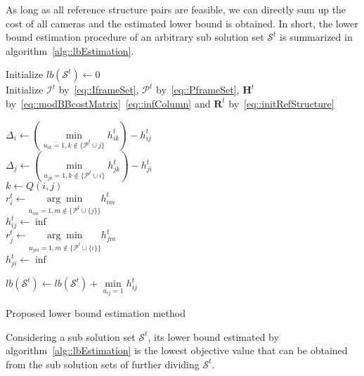 As long as all reference structure pairs are feasible, we can directly sum up the cost of all cameras and the estimated lower bound is obtained.
%
In short, the lower bound estimation procedure of an arbitrary sub solution set $\mathcal{S}^t$ is summarized in algorithm~\ref{alg::lbEstimation}.
%
\IncMargin{1em}
\begin{algorithm}[]
 \SetAlgoLined
 \BlankLine
 Initialize $lb(\mathcal{S}^t) \gets 0$\\
 Initialize $\mathcal{I}^t$ by~\eqref{eq::IframeSet}, $\mathcal{P}^t$ by~\eqref{eq::PframeSet}, $\mathbf{H}^t$ by~\eqref{eq::modBBcostMatrix}~\eqref{eq::infColumn} and $\mathbf{R}^t$ by~\eqref{eq::initRefStructure} \\
 {
 	$\Delta_i \gets \left( \underset{u_{ik}=1, k \notin \{\mathcal{P}^t \cup j\}}{\min} h_{ik}^t \right) - h_{ij}^t$ \\
	$\Delta_j \gets \left( \underset{u_{jk}=1, k \notin \{\mathcal{P}^t \cup i\}}{\min} h_{jk}^t \right) - h_{ji}^t$ \\
 	$k \gets Q(i,j)$ \\
 	{
 		$r_i^t \gets \underset{u_{im}=1, m \notin \{\mathcal{P}^t \cup \{j\}\}}{\arg \min} h_{im}^t$ \\
 		$h_{ij}^t \gets \inf$ \\
 	}
 	{
 		$r_j^t \gets \underset{u_{jm}=1, m \notin \{\mathcal{P}^t \cup \{i\}\}}{\arg \min} h_{jm}^t$ \\
 		$h_{ji}^t \gets \inf$ \\
 	}
 	
 }
 {
 	$lb(\mathcal{S}^t) \gets lb(\mathcal{S}^t) + \underset{u_{ij}=1}{\min} h_{ij}^t$ \\
 }
 \caption{\label{alg::lbEstimation}Proposed lower bound estimation method}
\end{algorithm}
\DecMargin{1em}
%
\begin{mylem}
Considering a sub solution set $\mathcal{S}^t$, its lower bound estimated by algorithm~\ref{alg::lbEstimation} is the lowest objective value that can be obtained from the sub solution sets of further dividing $\mathcal{S}^t$.
\label{lemma::lbEstimation}
\end{mylem}
